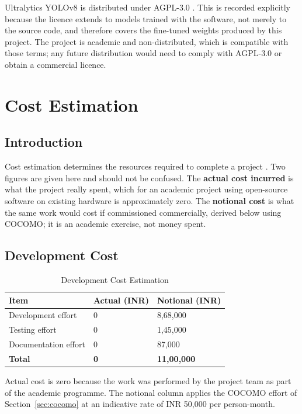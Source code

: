 \documentclass[
12pt,
a4paper,
oneside
]{report}
\begin{document}
Ultralytics YOLOv8 is distributed under AGPL-3.0 \cite{Jocher2023}. This is
recorded explicitly because the licence extends to models trained with the
software, not merely to the source code, and therefore covers the fine-tuned
weights produced by this project. The project is academic and non-distributed,
which is compatible with those terms; any future distribution would need to
comply with AGPL-3.0 or obtain a commercial licence.

\chapter{Cost Estimation}

\section{Introduction}

Cost estimation determines the resources required to complete a project
\cite{Boehm1981}. Two figures are given here and should not be confused. The
\textbf{actual cost incurred} is what the project really spent, which for an
academic project using open-source software on existing hardware is
approximately zero. The \textbf{notional cost} is what the same work would cost
if commissioned commercially, derived below using COCOMO; it is an academic
exercise, not money spent.

\section{Development Cost}

\begin{table}[H]
\centering
\begin{tabular}{|p{6cm}|p{2.6cm}|p{3.4cm}|}
\hline
\textbf{Item} & \textbf{Actual (INR)} & \textbf{Notional (INR)} \\
\hline
Development effort & 0 & 8{,}68{,}000 \\
\hline
Testing effort & 0 & 1{,}45{,}000 \\
\hline
Documentation effort & 0 & 87{,}000 \\
\hline
\textbf{Total} & \textbf{0} & \textbf{11{,}00{,}000} \\
\hline
\end{tabular}
\caption{Development Cost Estimation}
\end{table}

Actual cost is zero because the work was performed by the project team as part
of the academic programme. The notional column applies the COCOMO effort of
Section~\ref{sec:cocomo} at an indicative rate of INR 50{,}000 per
person-month.
\end{document}
